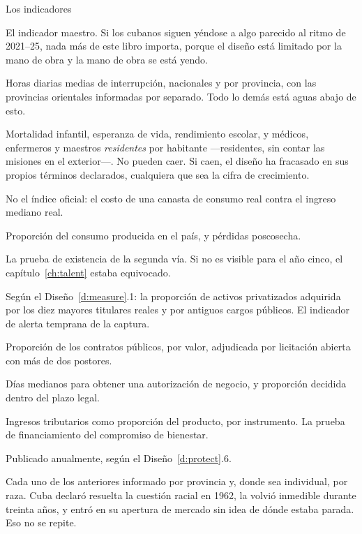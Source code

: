 \begin{design}{Los indicadores}
\label{d:indicators}
\begin{rules}
 El indicador maestro. Si los cubanos siguen yéndose a algo parecido al ritmo
de 2021--25, nada más de este libro importa, porque el diseño está limitado por la mano de obra y la
mano de obra se está yendo.

 Horas diarias medias de interrupción, nacionales y por provincia, con las
provincias orientales informadas por separado. Todo lo demás está aguas abajo de esto.

 Mortalidad infantil, esperanza de vida, rendimiento escolar,
y médicos, enfermeros y maestros \emph{residentes} por habitante ---residentes, sin contar las
misiones en el exterior---. No pueden caer. Si caen, el diseño ha fracasado en sus propios términos
declarados, cualquiera que sea la cifra de crecimiento.

 No el índice oficial: el costo de una canasta de
consumo real contra el ingreso mediano real.

 Proporción del consumo producida en el país, y pérdidas poscosecha.

 La prueba de existencia de la segunda
vía. Si no es visible para el año cinco, el capítulo~\ref{ch:talent} estaba equivocado.

 Según el Diseño~\ref{d:measure}.1: la proporción de activos privatizados
adquirida por los diez mayores titulares reales y por antiguos cargos públicos. El indicador de
alerta temprana de la captura.

 Proporción de los contratos públicos, por valor, adjudicada por
licitación abierta con más de dos postores.

 Días medianos para obtener una autorización de negocio, y proporción
decidida dentro del plazo legal.

 Ingresos tributarios como proporción del producto, por instrumento. La prueba
de financiamiento del compromiso de bienestar.

 Publicado anualmente, según el
Diseño~\ref{d:protect}.6.

 Cada uno de los anteriores informado por provincia y, donde sea individual,
por raza. Cuba declaró resuelta la cuestión racial en 1962, la volvió inmedible durante treinta
años, y entró en su apertura de mercado sin idea de dónde estaba parada. Eso no se repite.
\end{rules}
\end{design}

